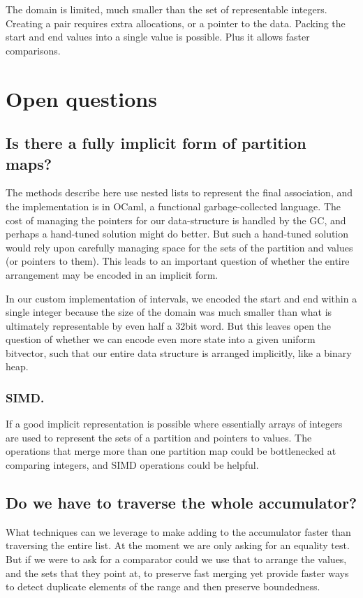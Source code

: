 \documentclass{article}
\begin{document}
The domain is limited, much smaller than the set of representable integers.
Creating a pair requires extra allocations, or a pointer to the data.
Packing the start and end values into a single value is possible.
Plus it allows faster comparisons.

\section{Open questions}

\subsection{Is there a fully implicit form of partition maps?}

The methods describe here use nested lists to represent the final association,
and the implementation is in OCaml,
a functional garbage-collected language.
The cost of managing the pointers for our data-structure is handled by the GC,
and perhaps a hand-tuned solution might do better.
But such a hand-tuned solution would rely upon carefully managing space for
the sets of the partition and values (or pointers to them).
This leads to an important question of whether the entire arrangement may be
encoded in an implicit form.

In our custom implementation of intervals, we encoded the start and end
within a single integer because the size of the domain was much smaller
than what is ultimately representable by even half a 32bit word.
But this leaves open the question of whether we can encode even more state
into a given uniform bitvector,
such that our entire data structure is arranged implicitly,
like a binary heap.

\subsubsection{SIMD.}

If a good implicit representation is possible where essentially arrays of
integers are used to represent the sets of a partition and pointers to values.
The operations that merge more than one partition map could be bottlenecked
at comparing integers,
and SIMD operations could be helpful.

\subsection{Do we have to traverse the whole accumulator?}

What techniques can we leverage to make adding to the accumulator
faster than traversing the entire list.
At the moment we are only asking for an equality test.
But if we were to ask for a comparator could we use that to arrange the values,
and the sets that they point at,
to preserve fast merging yet provide faster ways to detect duplicate elements
of the range and then preserve boundedness.
\end{document}
